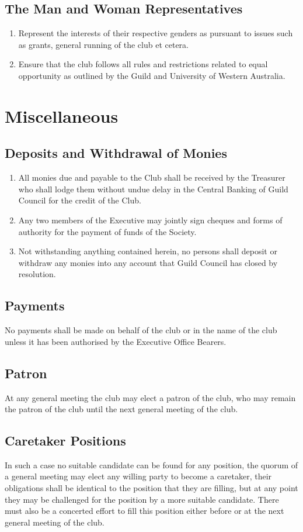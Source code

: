 \documentclass[10pt,a4paper]{report}
\begin{document}
		\section{The Man and Woman Representatives}
			\begin{enumerate}[label=\alph*]
				\item Represent the interests of their respective genders as pursuant to issues such as grants, general running of the club et cetera.
				\item Ensure that the club follows all rules and restrictions related to equal opportunity as outlined by the Guild and University of Western Australia.
			\end{enumerate}
		
	\chapter{Miscellaneous}
		\section{Deposits and Withdrawal of Monies}
			\begin{enumerate}[label=\arabic*]
				\item All monies due and payable to the Club shall be received by the Treasurer who shall lodge them without undue delay in the Central Banking of Guild Council for the credit of the Club.
				\item Any two members of the Executive may jointly sign cheques and forms of authority for the payment of funds of the Society.
				\item Not withstanding anything contained herein, no persons shall deposit or withdraw any monies into any account that Guild Council has closed by resolution. 
			\end{enumerate}
		\section{Payments}
			No payments shall be made on behalf of the club or in the name of the club unless it has been authorised by the Executive Office Bearers.
		\section{Patron}
			At any general meeting the club may elect a patron of the club, who may remain the patron of the club until the next general meeting of the club. \\
		\section{Caretaker Positions}
		In such a case no suitable candidate can be found for any position, the quorum of a general meeting may elect any willing party to become a caretaker, their obligations shall be identical to the position that they are filling, but at any point they may be challenged for the position by a more suitable candidate. There must also be a concerted effort to fill this position either before or at the next general meeting of the club.
\end{document}
